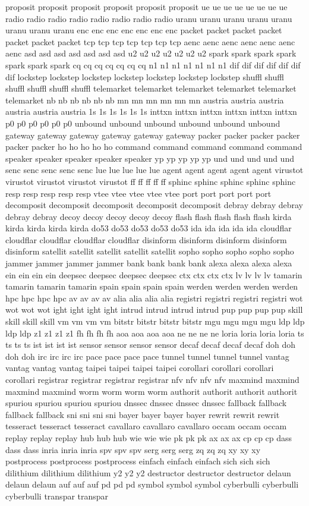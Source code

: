 \documentclass[letterpaper,twocolumn,10pt]{article}
\begin{document}
proposit proposit proposit proposit proposit proposit ue ue ue ue ue ue ue ue radio radio radio radio radio radio radio radio uranu uranu uranu uranu uranu uranu uranu uranu enc enc enc enc enc enc enc packet packet packet packet packet packet packet tcp tcp tcp tcp tcp tcp tcp aenc aenc aenc aenc aenc aenc aenc asd asd asd asd asd asd asd u2 u2 u2 u2 u2 u2 u2 spark spark spark spark spark spark spark cq cq cq cq cq cq cq n1 n1 n1 n1 n1 n1 n1 dif dif dif dif dif dif dif lockstep lockstep lockstep lockstep lockstep lockstep lockstep shuffl shuffl shuffl shuffl shuffl shuffl telemarket telemarket telemarket telemarket telemarket telemarket nb nb nb nb nb nb mn mn mn mn mn mn austria austria austria austria austria austria 1s 1s 1s 1s 1s 1s inttxn inttxn inttxn inttxn inttxn inttxn p0 p0 p0 p0 p0 p0 unbound unbound unbound unbound unbound unbound gateway gateway gateway gateway gateway gateway packer packer packer packer packer packer ho ho ho ho ho command command command command command speaker speaker speaker speaker speaker yp yp yp yp yp und und und und und senc senc senc senc senc lue lue lue lue lue agent agent agent agent agent virustot virustot virustot virustot virustot ff ff ff ff ff sphinc sphinc sphinc sphinc sphinc resp resp resp resp resp vtee vtee vtee vtee vtee port port port port port decomposit decomposit decomposit decomposit decomposit debray debray debray debray debray decoy decoy decoy decoy decoy flash flash flash flash flash kirda kirda kirda kirda kirda do53 do53 do53 do53 do53 ida ida ida ida ida cloudflar cloudflar cloudflar cloudflar cloudflar disinform disinform disinform disinform disinform satellit satellit satellit satellit satellit sopho sopho sopho sopho sopho jammer jammer jammer jammer bank bank bank bank alexa alexa alexa alexa ein ein ein ein deepsec deepsec deepsec deepsec ctx ctx ctx ctx lv lv lv lv tamarin tamarin tamarin tamarin spain spain spain spain werden werden werden werden hpc hpc hpc hpc av av av av alia alia alia alia registri registri registri registri wot wot wot wot ight ight ight ight intrud intrud intrud intrud pup pup pup pup skill skill skill skill vm vm vm vm bitstr bitstr bitstr bitstr mgu mgu mgu mgu ldp ldp ldp ldp z1 z1 z1 z1 fh fh fh fh aoa aoa aoa aoa ne ne ne ne loria loria loria loria ts ts ts ts ist ist ist ist sensor sensor sensor sensor decaf decaf decaf decaf doh doh doh doh irc irc irc irc pace pace pace pace tunnel tunnel tunnel tunnel vantag vantag vantag vantag taipei taipei taipei taipei corollari corollari corollari corollari registrar registrar registrar registrar nfv nfv nfv nfv maxmind maxmind maxmind maxmind worm worm worm worm authorit authorit authorit authorit spuriou spuriou spuriou spuriou dnssec dnssec dnssec dnssec fallback fallback fallback fallback sni sni sni sni bayer bayer bayer bayer rewrit rewrit rewrit tesseract tesseract tesseract cavallaro cavallaro cavallaro occam occam occam replay replay replay hub hub hub wie wie wie pk pk pk ax ax ax cp cp cp dass dass dass inria inria inria spv spv spv serg serg serg zq zq zq xy xy xy postprocess postprocess postprocess einfach einfach einfach sich sich sich dilithium dilithium dilithium y2 y2 y2 destructor destructor destructor delaun delaun delaun auf auf auf pd pd pd symbol symbol symbol cyberbulli cyberbulli cyberbulli transpar transpar 
\end{document}
